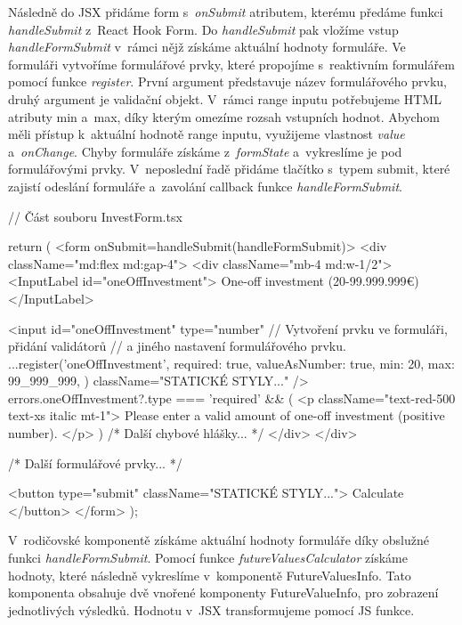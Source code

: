 Následně do JSX přidáme form s~\emph{onSubmit} atributem, kterému předáme funkci \emph{handleSubmit} z~React Hook Form. Do \emph{handleSubmit} pak vložíme vstup \emph{handleFormSubmit} v~rámci nějž získáme aktuální hodnoty formuláře. 
Ve formuláři vytvoříme formulářové prvky, které propojíme s~reaktivním formulářem pomocí funkce \emph{register}. První argument představuje název formulářového prvku, druhý argument je validační objekt. 
V~rámci range inputu potřebujeme HTML atributy min a~max, díky kterým omezíme rozsah vstupních hodnot. Abychom měli přístup k~aktuální hodnotě range inputu, využijeme vlastnost \emph{value} a~\emph{onChange}. 
Chyby formuláře získáme z~\emph{formState} a~vykreslíme je pod formulářovými prvky. V~neposlední řadě přidáme tlačítko s~typem submit, které zajistí odeslání formuláře a~zavolání callback funkce \emph{handleFormSubmit}.

\begin{prog}
// Část souboru InvestForm.tsx

return (
  <form onSubmit={handleSubmit(handleFormSubmit)}>
    <div className="md:flex md:gap-4">
      <div className="mb-4 md:w-1/2">
        <InputLabel id="oneOffInvestment">
          One-off investment (20-99.999.999€)
        </InputLabel>

        <input
          id="oneOffInvestment"
          type="number"
          // Vytvoření prvku ve formuláři, přidání validátorů 
          // a jiného nastavení formulářového prvku.
          {...register('oneOffInvestment', {
            required: true,
            valueAsNumber: true,
            min: 20,
            max: 99_999_999,
          })}
          className="STATICKÉ STYLY..."
        />
        {errors.oneOffInvestment?.type === 'required' && (
          <p className="text-red-500 text-xs italic mt-1">
            Please enter a valid amount of one-off investment (positive number).
          </p>
        )}
        {/* Další chybové hlášky... */}
      </div>
    </div>

    {/* Další formulářové prvky... */}

    <button type="submit" className="STATICKÉ STYLY...">
      Calculate
    </button>
  </form>
);
\end{prog}

V~rodičovské komponentě získáme aktuální hodnoty formuláře díky obslužné funkci \emph{handleFormSubmit}. Pomocí funkce \emph{futureValuesCalculator} získáme hodnoty, které následně vykreslíme v~komponentě FutureValuesInfo. 
Tato komponenta obsahuje dvě vnořené komponenty FutureValueInfo, pro zobrazení jednotlivých výsledků. Hodnotu v~JSX transformujeme pomocí JS funkce.

